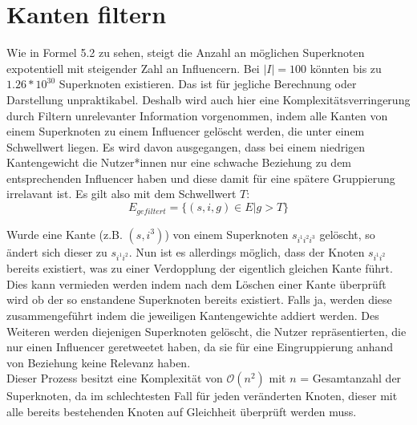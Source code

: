 \section{Kanten filtern}
\label{sec:kanten-filtern}
Wie in Formel 5.2 zu sehen, steigt die Anzahl an möglichen Superknoten expotentiell mit steigender Zahl an Influencern.
Bei $|I| = 100$ könnten bis zu $1.26*10^{30}$ Superknoten existieren. Das ist für jegliche Berechnung oder Darstellung unpraktikabel.
Deshalb wird auch hier eine Komplexitätsverringerung durch Filtern unrelevanter Information vorgenommen, indem alle Kanten von einem Superknoten zu einem Influencer gelöscht werden, die unter einem Schwellwert liegen. 
Es wird davon ausgegangen, dass  bei einem niedrigen Kantengewicht die Nutzer*innen nur eine schwache Beziehung zu dem entsprechenden Influencer haben und diese damit für eine spätere Gruppierung irrelavant ist. 
Es gilt also mit dem Schwellwert $T$: \begin{equation}
	E_{gefiltert} = \{(s,i,g)\in E|g>T\}
\end{equation}

Wurde eine Kante (z.B. $(s,i^3)$) von einem Superknoten $s_{i^1i^2i^3}$ gelöscht, so ändert sich dieser zu $s_{i^1i^2}$. Nun ist es allerdings möglich, dass der Knoten $s_{i^1i^2}$ bereits existiert, was zu einer Verdopplung der eigentlich gleichen Kante führt. Dies kann vermieden werden indem nach dem Löschen einer Kante überprüft wird ob der so enstandene Superknoten bereits existiert. Falls ja, werden diese zusammengeführt indem die jeweiligen Kantengewichte addiert werden.
Des Weiteren werden diejenigen Superknoten gelöscht, die Nutzer repräsentierten, die nur einen Influencer \gls{geretweetet} haben, da sie für eine Eingruppierung anhand von Beziehung keine Relevanz haben.\\
Dieser Prozess besitzt eine Komplexität von $\mathcal{O}(n^2)$ mit $n$ = Gesamtanzahl der Superknoten, da im schlechtesten Fall für jeden veränderten Knoten, dieser mit alle bereits bestehenden Knoten auf Gleichheit überprüft werden muss.
